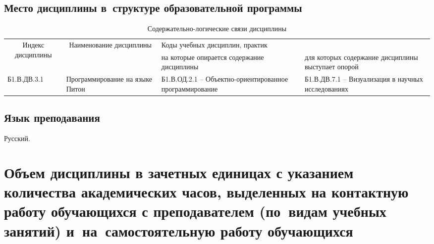\documentclass[a4paper,12pt]{article}
\begin{document}
\subsection{Место дисциплины в~структуре образовательной программы}

  \begin{table}[H]
  \setlength\arraycolsep{3pt}
  \caption{Содержательно-логические связи дисциплины}
  \begin{tabular}{|l|p{18ex}|*{2}{p{23ex}|}}
  \hline
  \multicolumn{1}{|c|}{\multirow{2}{13ex}{\centering Индекс \linebreak дисциплины}} &
  \multicolumn{1}{c|}{\multirow{2}{18ex}{\centering Наименование \linebreak дисциплины}} & 
  \multicolumn{2}{p{46ex}|}{\centering Коды учебных дисциплин, практик} \\
  \cline{3-4}
   & & 
  \centering на которые опирается содержание дисциплины & 
  \centering\arraybackslash для которых содержание дисциплины выступает опорой
  \\ \hline
  Б1.В.ДВ.3.1 & Программирование на языке Питон 
  & 
  
  Б1.В.ОД.2.1 -- Объектно-ориентированное программирование 
  & 
  
  Б1.В.ДВ.7.1 -- Визуализация в научных исследованиях 
  \\ \hline
  \end{tabular}
  \end{table}


\subsection{Язык преподавания} 
  Русский.
  



\newpage

\section{Объем дисциплины в зачетных единицах с указанием количества академических часов, выделенных на контактную работу обучающихся с преподавателем (по~видам учебных занятий) и~на~самостоятельную работу обучающихся}
\end{document}
